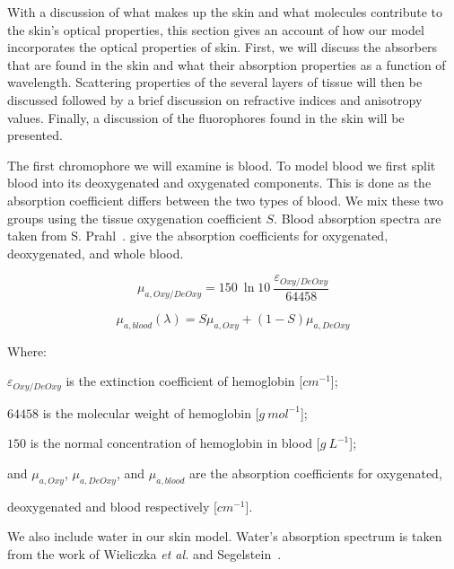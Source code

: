 
With a discussion of what makes up the skin and what molecules contribute to the skin's optical properties, this section gives an account of how our model incorporates the optical properties of skin.
First, we will discuss the absorbers that are found in the skin and what their absorption properties as a function of wavelength.
Scattering properties of the several layers of tissue will then be discussed followed by a brief discussion on refractive indices and anisotropy values.
Finally, a discussion of the fluorophores found in the skin will be presented.

\medskip

The first chromophore we will examine is blood.
To model blood we first split blood into its deoxygenated and oxygenated components.
This is done as the absorption coefficient differs between the two types of blood. We mix these two groups using the tissue oxygenation coefficient $S$. Blood absorption spectra are taken from S. Prahl~\cite{prahlblood}.
 give the absorption coefficients for oxygenated, deoxygenated, and whole blood.


\begin{equation}
\mu_{a,Oxy/DeOxy}=150\ \ln10\ \frac{\varepsilon_{Oxy/DeOxy}}{64458}
\label{eqn:oxy}
\end{equation}

\begin{equation}
\mu_{a,blood}(\lambda) = S\mu_{a,Oxy}+(1-S)\mu_{a,DeOxy}
\label{eqn:blood}
\end{equation}

\noindent Where:

\indent $\varepsilon_{Oxy/DeOxy}$ is the extinction coefficient of hemoglobin [$cm^{-1}$];

\indent $64458$ is the molecular weight of hemoglobin [$g\ mol^{-1}$];

\indent $150$ is the normal concentration of hemoglobin in blood [$g\ L^{-1}$];

\indent and $\mu_{a,Oxy}$, $\mu_{a,DeOxy}$, and $\mu_{a,blood}$ are the absorption coefficients for oxygenated, 

\indent deoxygenated and blood respectively [$cm^{-1}$].

\medskip

We also include water in our skin model.
Water's absorption spectrum is taken from the work of Wieliczka \textit{et al.} and Segelstein~\cite{wieliczka1989wedge,segelstein1981complex}.

